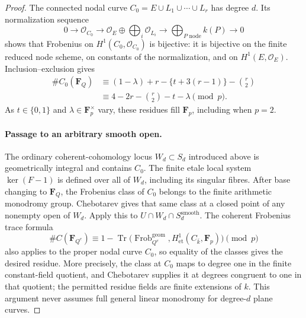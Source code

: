 \begin{proof}
The connected nodal curve
$C_0=E\cup L_1\cup\cdots\cup L_r$ has degree $d$.
Its normalization sequence
\[
0\longrightarrow\mathcal O_{C_0}\longrightarrow
\mathcal O_E\oplus\bigoplus_i\mathcal O_{L_i}
\longrightarrow\bigoplus_{P\text{ node}}k(P)\longrightarrow0
\]
shows that Frobenius on $H^1(C_0,\mathcal O_{C_0})$ is bijective:
it is bijective on the finite reduced node scheme, on constants of
the normalization, and on $H^1(E,\mathcal O_E)$.
Inclusion--exclusion gives
\begin{align*}
 \#C_0(\mathbf F_Q)
 &\equiv (1-\lambda)+r-\{t+3(r-1)\}-\binom r2\\
 &\equiv 4-2r-\binom r2-t-\lambda\pmod p.
\end{align*}
As $t\in\{0,1\}$ and $\lambda\in\mathbf F_p^\times$ vary, these
residues fill $\mathbf F_p$, including when $p=2$.

\paragraph{Passage to an arbitrary smooth open.}
The ordinary coherent-cohomology locus $W_d\subset S_d$ introduced
above is geometrically integral and contains $C_0$.
The finite etale local system $\ker(F-1)$ is defined over all of $W_d$,
including its singular fibres.  After base changing to $\mathbf F_Q$,
the Frobenius class of $C_0$ belongs to the finite arithmetic
monodromy group.  Chebotarev gives that same class at a closed point
of any nonempty open of $W_d$.  Apply this to
$U\cap W_d\cap S_d^{\mathrm{smooth}}$.
The coherent Frobenius trace formula
\[
 \#C(\mathbf F_{Q^e})\equiv
 1-\operatorname{Tr}\bigl(\operatorname{Frob}_{Q^e}^{\mathrm{geom}},
 H^1_{\mathrm{et}}(C_{\bar k},\mathbf F_p)\bigr)\pmod p
\]
also applies to the proper nodal curve $C_0$, so equality of the
classes gives the desired residue.  More precisely, the class at
$C_0$ maps to degree one in the finite constant-field quotient, and
Chebotarev supplies it at degrees congruent to one in that quotient;
the permitted residue fields are finite extensions of $k$.
This argument never assumes full general linear monodromy for
degree-$d$ plane curves.
\end{proof}

